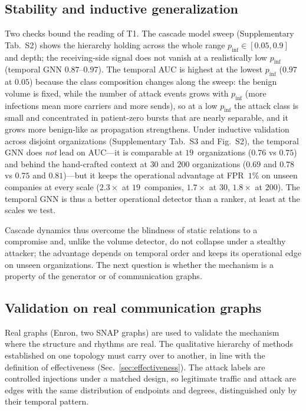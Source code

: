 \subsection{Stability and inductive generalization}
\label{sec:res-stability}
Two checks bound the reading of T1. The cascade model sweep (Supplementary Tab.~S2) shows the hierarchy
holding across the whole range $p_\mathrm{inf}\!\in\![0.05,0.9]$ and depth; the receiving-side signal does not
vanish at a realistically low $p_\mathrm{inf}$ (temporal GNN $0.87$--$0.97$). The temporal AUC is highest at
the lowest $p_\mathrm{inf}$ ($0.97$ at $0.05$) because the class composition changes along the sweep: the
benign volume is fixed, while the number of attack events grows with $p_\mathrm{inf}$ (more infections mean
more carriers and more sends), so at a low $p_\mathrm{inf}$ the attack class is small and concentrated in
patient-zero bursts that are nearly separable, and it grows more benign-like as propagation strengthens.
Under inductive validation across disjoint organizations (Supplementary Tab.~S3 and Fig.~S2), the temporal
GNN does \emph{not} lead on AUC---it is comparable at $19$~organizations ($0.76$ vs $0.75$) and behind the
hand-crafted context at $30$ and $200$ organizations ($0.69$ and $0.78$ vs $0.75$ and $0.81$)---but it keeps
the operational advantage at FPR~$1\%$ on unseen companies at every scale ($2.3\times$ at
$19$~companies, $1.7\times$ at $30$, $1.8\times$ at $200$). The temporal
GNN is thus a better operational detector than a ranker, at least at the scales we test.

\noindent Cascade dynamics thus overcome the blindness of static relations to a compromise and, unlike the
volume detector, do not collapse under a stealthy attacker; the advantage depends on temporal order and keeps
its operational edge on unseen organizations. The next question is whether the mechanism is a property of the generator or of communication
graphs.

\subsection{Validation on real communication graphs}
\label{sec:res-realgraphs}
Real graphs (Enron, two SNAP graphs) are used to validate the mechanism where the structure and rhythms are
real. The qualitative hierarchy of methods established on one topology must carry over to another, in line
with the definition of effectiveness (Sec.~\ref{sec:effectiveness}). The attack labels are controlled
injections under a matched design, so legitimate traffic and attack are edges with the same distribution of
endpoints and degrees, distinguished only by their temporal pattern.

